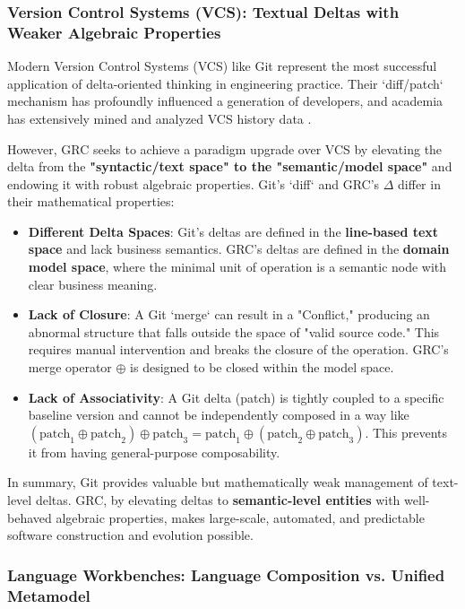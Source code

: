 \documentclass[11pt]{article}
\begin{document}
\subsubsection{Version Control Systems (VCS): Textual Deltas with Weaker Algebraic Properties}

Modern Version Control Systems (VCS) like Git represent the most successful application of delta-oriented thinking in engineering practice. Their `diff/patch` mechanism has profoundly influenced a generation of developers, and academia has extensively mined and analyzed VCS history data \cite{gousios2013}.

However, GRC seeks to achieve a paradigm upgrade over VCS by elevating the delta from the \textbf{"syntactic/text space" to the "semantic/model space"} and endowing it with robust algebraic properties. Git's `diff` and GRC's $\Delta$ differ in their mathematical properties:
\begin{itemize}
    \item \textbf{Different Delta Spaces}: Git's deltas are defined in the \textbf{line-based text space} and lack business semantics. GRC's deltas are defined in the \textbf{domain model space}, where the minimal unit of operation is a semantic node with clear business meaning.
    \item \textbf{Lack of Closure}: A Git `merge` can result in a "Conflict," producing an abnormal structure that falls outside the space of "valid source code." This requires manual intervention and breaks the closure of the operation. GRC's merge operator $\oplus$ is designed to be closed within the model space.
    \item \textbf{Lack of Associativity}: A Git delta (patch) is tightly coupled to a specific baseline version and cannot be independently composed in a way like $(\text{patch}_1 \oplus \text{patch}_2) \oplus \text{patch}_3 = \text{patch}_1 \oplus (\text{patch}_2 \oplus \text{patch}_3)$. This prevents it from having general-purpose composability.
\end{itemize}

In summary, Git provides valuable but mathematically weak management of text-level deltas. GRC, by elevating deltas to \textbf{semantic-level entities} with well-behaved algebraic properties, makes large-scale, automated, and predictable software construction and evolution possible.

\subsubsection{Language Workbenches: Language Composition vs. Unified Metamodel}
\end{document}
